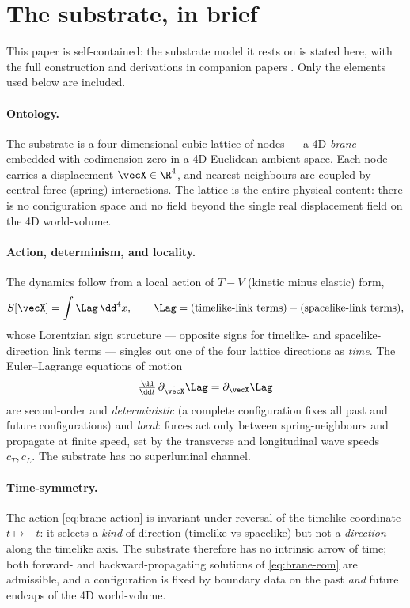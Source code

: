 \section{The substrate, in brief}
\label{sec:substrate}

This paper is self-contained: the substrate model it rests on is stated here, with the full
construction and derivations in companion papers
\citep{MolzbergerSubstrate,MolzbergerGaugeColor}. Only the elements used below are included.

\paragraph{Ontology.}
The substrate is a four-dimensional cubic lattice of nodes --- a 4D \emph{brane} --- embedded with
codimension zero in a 4D Euclidean ambient space. Each node carries a displacement
$\vecX\in\R^{4}$, and nearest neighbours are coupled by central-force (spring) interactions. The
lattice is the entire physical content: there is no configuration space and no field beyond the
single real displacement field on the 4D world-volume.

\paragraph{Action, determinism, and locality.}
The dynamics follow from a local action of $T-V$ (kinetic minus elastic) form,
\begin{equation}
  S[\vecX]=\int \Lag\,\dd^4x ,\qquad
  \Lag=\text{(timelike-link terms)}-\text{(spacelike-link terms)} ,
  \label{eq:brane-action}
\end{equation}
whose Lorentzian sign structure --- opposite signs for timelike- and spacelike-direction link
terms --- singles out one of the four lattice directions as \emph{time}. The Euler--Lagrange
equations of motion
\begin{equation}
  \tfrac{\dd}{\dd t}\,\partial_{\dot{\vecX}}\Lag=\partial_{\vecX}\Lag
  \label{eq:brane-eom}
\end{equation}
are second-order and \emph{deterministic} (a complete configuration fixes all past and future
configurations) and \emph{local}: forces act only between spring-neighbours and propagate at
finite speed, set by the transverse and longitudinal wave speeds $c_T,c_L$. The substrate has no
superluminal channel.

\paragraph{Time-symmetry.}
The action \eqref{eq:brane-action} is invariant under reversal of the timelike coordinate
$t\mapsto -t$: it selects a \emph{kind} of direction (timelike vs spacelike) but not a
\emph{direction} along the timelike axis. The substrate therefore has no intrinsic arrow of time;
both forward- and backward-propagating solutions of \eqref{eq:brane-eom} are admissible, and a
configuration is fixed by boundary data on the past \emph{and} future endcaps of the 4D
world-volume.

